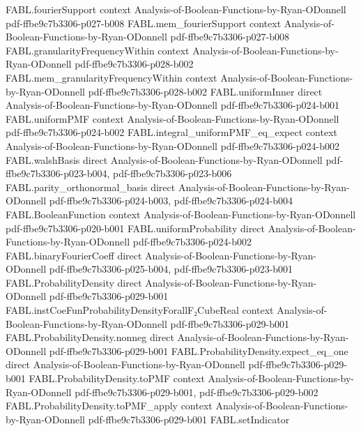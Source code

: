 \begin{theorem}
\proofstep
  {FABL.fourierSupport}
  {context}
  {Analysis-of-Boolean-Functions-by-Ryan-ODonnell}
  {pdf-ffbe9c7b3306-p027-b008}
\proofstep
  {FABL.mem_fourierSupport}
  {context}
  {Analysis-of-Boolean-Functions-by-Ryan-ODonnell}
  {pdf-ffbe9c7b3306-p027-b008}
\proofstep
  {FABL.granularityFrequencyWithin}
  {context}
  {Analysis-of-Boolean-Functions-by-Ryan-ODonnell}
  {pdf-ffbe9c7b3306-p028-b002}
\proofstep
  {FABL.mem_granularityFrequencyWithin}
  {context}
  {Analysis-of-Boolean-Functions-by-Ryan-ODonnell}
  {pdf-ffbe9c7b3306-p028-b002}
\proofstep
  {FABL.uniformInner}
  {direct}
  {Analysis-of-Boolean-Functions-by-Ryan-ODonnell}
  {pdf-ffbe9c7b3306-p024-b001}
\proofstep
  {FABL.uniformPMF}
  {context}
  {Analysis-of-Boolean-Functions-by-Ryan-ODonnell}
  {pdf-ffbe9c7b3306-p024-b002}
\proofstep
  {FABL.integral_uniformPMF_eq_expect}
  {context}
  {Analysis-of-Boolean-Functions-by-Ryan-ODonnell}
  {pdf-ffbe9c7b3306-p024-b002}
\proofstep
  {FABL.walshBasis}
  {direct}
  {Analysis-of-Boolean-Functions-by-Ryan-ODonnell}
  {pdf-ffbe9c7b3306-p023-b004,
    pdf-ffbe9c7b3306-p023-b006}
\proofstep
  {FABL.parity_orthonormal_basis}
  {direct}
  {Analysis-of-Boolean-Functions-by-Ryan-ODonnell}
  {pdf-ffbe9c7b3306-p024-b003,
    pdf-ffbe9c7b3306-p024-b004}
\proofstep
  {FABL.BooleanFunction}
  {context}
  {Analysis-of-Boolean-Functions-by-Ryan-ODonnell}
  {pdf-ffbe9c7b3306-p020-b001}
\proofstep
  {FABL.uniformProbability}
  {direct}
  {Analysis-of-Boolean-Functions-by-Ryan-ODonnell}
  {pdf-ffbe9c7b3306-p024-b002}
\proofstep
  {FABL.binaryFourierCoeff}
  {direct}
  {Analysis-of-Boolean-Functions-by-Ryan-ODonnell}
  {pdf-ffbe9c7b3306-p025-b004,
    pdf-ffbe9c7b3306-p023-b001}
\proofstep
  {FABL.ProbabilityDensity}
  {direct}
  {Analysis-of-Boolean-Functions-by-Ryan-ODonnell}
  {pdf-ffbe9c7b3306-p029-b001}
\proofstep
  {FABL.instCoeFunProbabilityDensityForallF₂CubeReal}
  {context}
  {Analysis-of-Boolean-Functions-by-Ryan-ODonnell}
  {pdf-ffbe9c7b3306-p029-b001}
\proofstep
  {FABL.ProbabilityDensity.nonneg}
  {direct}
  {Analysis-of-Boolean-Functions-by-Ryan-ODonnell}
  {pdf-ffbe9c7b3306-p029-b001}
\proofstep
  {FABL.ProbabilityDensity.expect_eq_one}
  {direct}
  {Analysis-of-Boolean-Functions-by-Ryan-ODonnell}
  {pdf-ffbe9c7b3306-p029-b001}
\proofstep
  {FABL.ProbabilityDensity.toPMF}
  {context}
  {Analysis-of-Boolean-Functions-by-Ryan-ODonnell}
  {pdf-ffbe9c7b3306-p029-b001,
    pdf-ffbe9c7b3306-p029-b002}
\proofstep
  {FABL.ProbabilityDensity.toPMF_apply}
  {context}
  {Analysis-of-Boolean-Functions-by-Ryan-ODonnell}
  {pdf-ffbe9c7b3306-p029-b001}
\proofstep
  {FABL.setIndicator}

\end{theorem}
